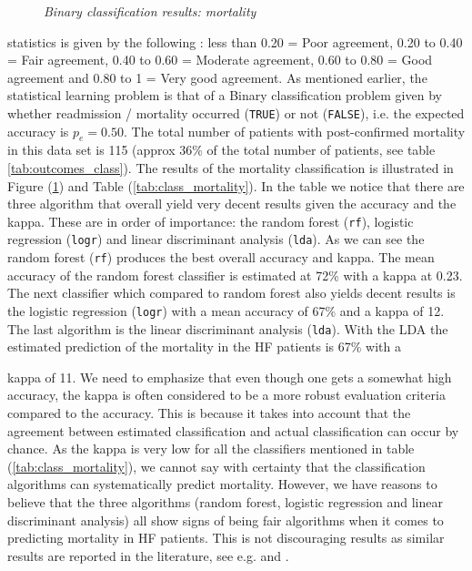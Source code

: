 \documentclass[../thesis.tex]{subfiles}
\begin{document}
\begin{figure}[h!]
    \centering
    \scalebox{.8}{}
    \caption[Binary classification results: mortality]{\textit{Binary classification results: mortality}}
    \label{fig:bi_class_mort}
\end{figure}

\newpage
\noindent statistics is given by the following \citep{ashby1991practical}: less than 0.20 = Poor agreement, 0.20 to 0.40 = Fair agreement, 0.40 to 0.60 = Moderate agreement, 0.60 to 0.80 = Good agreement and 0.80 to 1 = Very good agreement. As mentioned earlier, the statistical learning problem is that of a Binary classification problem given by whether  readmission / mortality occurred (\texttt{TRUE}) or not (\texttt{FALSE}), i.e. the expected accuracy is $p_e = 0.50$. The total number of patients with post-confirmed mortality in this data set is 115 (approx 36\% of the total number of patients, see table \ref{tab:outcomes_class}). The results of the mortality classification is illustrated in Figure (\ref{fig:bi_class_mort}) and Table (\ref{tab:class_mortality}). In the table we notice that there are three algorithm that overall yield very decent results given the accuracy and the kappa. These are in order of importance: the random forest (\texttt{rf}), logistic regression (\texttt{logr}) and linear discriminant analysis (\texttt{lda}). As we can see the random forest (\texttt{rf}) \citep{ho1995random} produces the best overall accuracy and kappa. The mean accuracy of the random forest classifier is estimated at 72\% with a kappa at 0.23. The next classifier which compared to random forest also yields decent results is the logistic regression (\texttt{logr}) with a mean accuracy of 67\% and a kappa of 12. The last algorithm is the linear discriminant analysis (\texttt{lda}). With the LDA the estimated prediction of the mortality in the HF patients is 67\% with a 


\newpage
\noindent kappa of 11. We need to emphasize that even though one gets a somewhat high accuracy, the kappa is often considered to be a more robust evaluation criteria compared to the accuracy. This is because it takes into account that the agreement between estimated classification and actual classification can occur by chance. As the kappa is very low for all the classifiers mentioned in table (\ref{tab:class_mortality}), we cannot say with certainty that the classification algorithms can systematically predict mortality. However, we have reasons to believe that the three algorithms (random forest, logistic regression and linear discriminant analysis) all show signs of being fair algorithms when it comes to predicting mortality in HF patients. This is not discouraging results as similar results are reported in the literature, see e.g. \cite{shah2014phenomapping} and \cite{panahiazar2015using}.
\end{document}
